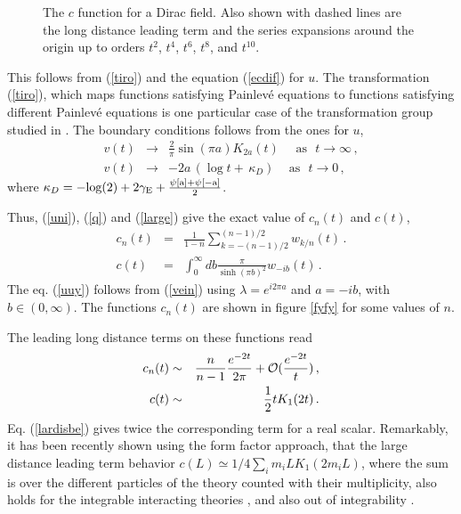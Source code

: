 \documentclass[a4paper]{article}
\begin{document}
\begin{figure} [tbp]
\centering
\leavevmode
\epsfysize=5.5cm
\bigskip
{} 
\caption{The $c$ function for a Dirac field. Also shown with dashed lines are the long distance leading term and the series expansions around the origin up to orders $t^2$, $t^4$, $t^6$, $t^8$, and $t^{10}$.}
\label{fity}
\end{figure}

This follows from (\ref{tiro}) and the equation (\ref{ecdif}) for $u$. The transformation (\ref{tiro}), which maps functions satisfying Painlev\'e equations to functions satisfying different Painlev\'e equations is one particular case of the transformation group studied in \cite{rims2}. The boundary conditions follows from the ones for $u$,
\begin{eqnarray}
v(t) &\rightarrow &\frac{2}{\pi} \sin ( \pi a) K_{2a} (t)\,\,\,\,\,\,\,\, \textrm{as} \,\,\,\, t\rightarrow \infty \,,\label{large}\\
v(t)&\rightarrow& -2a \,(\log t+\,\kappa_D)\,\,\,\,\,\,\,\textrm{as}\,\,\,\,t\rightarrow 0 \label{fermion0}\,,
\end{eqnarray}
where   $
\kappa_D=\rm -log(2)+2{\gamma}_E+\frac{\psi[a]+\psi[-a]}{2}
$.

Thus, (\ref{uni}), (\ref{q}) and (\ref{large}) give the exact value of $c_n(t)$ and $c(t)$,
\begin{eqnarray}
c_n(t)&=&\frac{1}{1-n}\sum_{k=-(n-1)/2}^{(n-1)/2}w_{k/n}(t)\,.
\label{doblew}
\\
c(t)&=&\int_0^{\infty}db \frac{\pi}{\sinh(\pi b)^2}w_{-i b}(t)\,.\label{uuy}
\end{eqnarray}
The eq. (\ref{uuy}) follows from (\ref{vein}) using $\lambda=e^{i 2\pi a}$ and $a=-i b$, with $b\in (0,\infty)$. 
The functions $c_n(t)$ are shown in figure \ref{fyfy} for some values of $n$.

 The leading long distance terms on these functions read
\begin{eqnarray}
c_n(t) &\sim& \frac{n}{n-1}\frac{e^{-2t}}{2\pi}+{\cal O}(\frac{e^{-2t}}{t})\,,\label{distan}\\
 c(t)&\sim& \frac{1}{2} t K_1(2 t)\,.\label{lardisbe}
\end{eqnarray} 
Eq. (\ref{lardisbe}) gives twice the corresponding term for a real scalar. Remarkably, it has been recently shown using the form factor approach, that the large distance leading term behavior $c(L)\simeq 1/4\sum_i m_i L K_1(2 m_i L)$, where the sum is over the different particles of the theory counted with their multiplicity, also holds for the integrable interacting theories \cite{ccd}, and also out of integrability \cite{dy}.   
\end{document}
